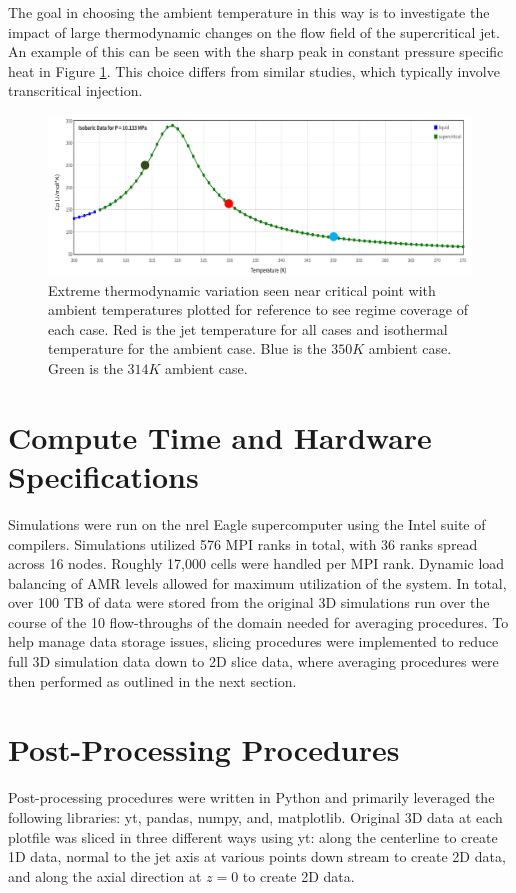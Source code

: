 The goal in choosing the ambient temperature in this way is to investigate the impact of large thermodynamic changes on the flow field of the supercritical jet. An example of this can be seen with the sharp peak in constant pressure specific heat in Figure \ref{cp_vs_case}. This choice differs from similar studies, which typically involve transcritical injection. 

\begin{figure}[H]
\begin{center}
\includegraphics[scale=0.5]{figures/cp_cases.png}
\end{center}
\caption{Extreme thermodynamic variation seen near critical point with ambient temperatures plotted for reference to see regime coverage of each case. Red is the jet temperature for all cases and isothermal temperature for the ambient case. Blue is the $350 K$ ambient case. Green is the $314 K$ ambient case. }
\label{cp_vs_case}
\end{figure}

\section{Compute Time and Hardware Specifications}
Simulations were run on the \gls{nrel} Eagle supercomputer using the Intel suite of compilers. Simulations utilized 576 MPI ranks in total, with 36 ranks spread across 16 nodes. Roughly 17,000 cells were handled per MPI rank. Dynamic load balancing of AMR levels allowed for maximum utilization of the system. In total, over 100 TB of data were stored from the original 3D simulations run over the course of the 10 flow-throughs of the domain needed for averaging procedures. To help manage data storage issues, slicing procedures were implemented to reduce full 3D simulation data down to 2D slice data, where averaging procedures were then performed as outlined in the next section. 
\section{Post-Processing Procedures}
Post-processing procedures were written in Python and primarily leveraged the following libraries: yt, pandas, numpy, and, matplotlib. Original 3D data at each plotfile was sliced in three different ways using yt: along the centerline to create 1D data, normal to the jet axis at various points down stream to create 2D data, and along the axial direction at $z=0$ to create 2D data. 


